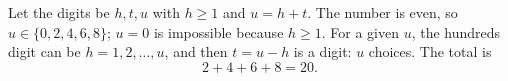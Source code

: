 Let the digits be $h,t,u$ with $h\ge1$ and $u=h+t$. The number is even, so $u\in\{0,2,4,6,8\}$; $u=0$ is impossible because $h\ge1$. For a given $u$, the hundreds digit can be $h=1,2,\dots,u$, and then $t=u-h$ is a digit: $u$ choices. The total is
\[2+4+6+8=\boxed{20}.\]

